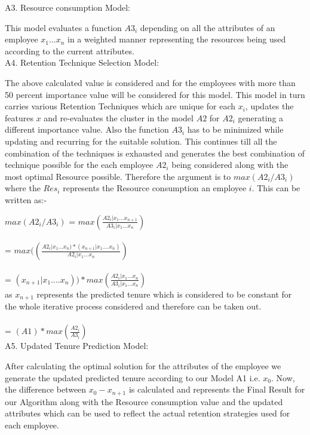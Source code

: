 \documentclass[a4paper, 14 pt, conference]{ieeeconf}
\begin{document}
A3.  Resource consumption Model:

This model evaluates a function $A3_{i}$ depending on all the attributes of an employee $x_{1}...x_{n}$ in a weighted manner representing the resources being used according to the current attributes.
\\

A4.  Retention Technique Selection Model:

    The above calculated value is considered and for the employees with more than 50 percent importance value will be considered for this model. This model in turn carries various Retention Techniques which are unique for each $x_{i}$, updates the features $x$ and re-evaluates the cluster in the model $A2$ for $A2_{i}$ generating a different importance value. Also the function $A3_{i}$ has to be minimized while updating and recurring for the suitable solution. This continues till all the combination of the techniques is exhausted and generates the best combination of technique possible for the each employee $A2_{i}$ being considered along with the most optimal Resource possible. Therefore the argument is to $max(A2_{i}/A3_{i})$ where the $Res_{i}$ represents the Resource consumption an employee $i$. This can be written as:-
    
    $max(A2_{i}/A3_{i})$ = $max(\frac{A2_{i}|x_{1}...x_{n+1}}{A3_{i}|x_{1}...x_{n}})$
    \\
    \\
    = $max((\frac{A2_{i}|x_{1}...x_{n})*(x_{n+1}|x_{1}....x_{n})}{A2_{i}|x_{1}...x_{n}})$
    \\
    \\
    = $(x_{n+1}|x_{1}....x_{n}))*max(\frac{A2_{i}|x_{1}...x_{n}}{A3_{i}|x_{1}...x_{n}})$ 
    \\ as $x_{n+1}$ represents the predicted tenure which is considered to be constant for the whole iterative process considered and therefore can be taken out.
    \\
    \\
    = $(A1)*max(\frac{A2_{i}}{A3_{i}})$
    \\
    
A5.  Updated Tenure Prediction Model:

After calculating the optimal solution for the attributes of the employee we generate the updated predicted tenure according to our Model A1 i.e. $x_{0}$.
Now, the difference between $x_{0}-x_{n+1}$ is calculated and represents the Final Result for our Algorithm along with the Resource consumption value and the updated attributes which can be used to reflect the actual retention strategies used for each employee.
\end{document}

